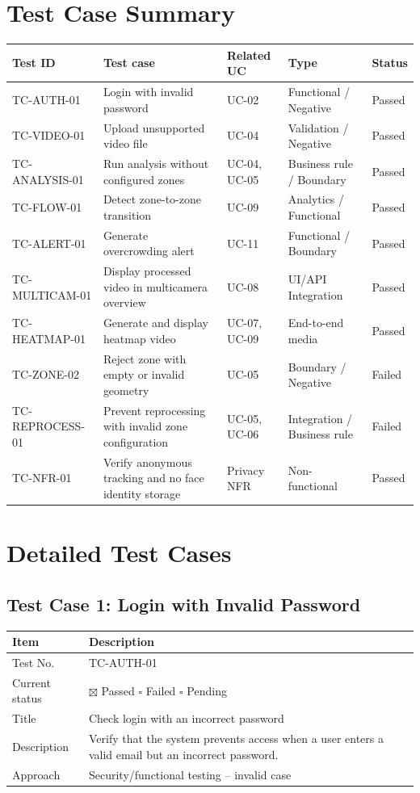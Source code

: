 \documentclass[12pt,a4paper]{report}
\begin{document}
\section{Test Case Summary}

\begin{longtable}{|p{2.5cm}|p{5.1cm}|p{2.3cm}|p{2.8cm}|p{1.9cm}|}
\hline
\rowcolor{HeaderBlue}
\textbf{Test ID} & \textbf{Test case} & \textbf{Related UC} & \textbf{Type} & \textbf{Status} \\
\hline
TC-AUTH-01 & Login with invalid password & UC-02 & Functional / Negative & Passed \\
\hline
TC-VIDEO-01 & Upload unsupported video file & UC-04 & Validation / Negative & Passed \\
\hline
TC-ANALYSIS-01 & Run analysis without configured zones & UC-04, UC-05 & Business rule / Boundary & Passed \\
\hline
TC-FLOW-01 & Detect zone-to-zone transition & UC-09 & Analytics / Functional & Passed \\
\hline
TC-ALERT-01 & Generate overcrowding alert & UC-11 & Functional / Boundary & Passed \\
\hline
TC-MULTICAM-01 & Display processed video in multicamera overview & UC-08 & UI/API Integration & Passed \\
\hline
TC-HEATMAP-01 & Generate and display heatmap video & UC-07, UC-09 & End-to-end media & Passed \\
\hline
TC-ZONE-02 & Reject zone with empty or invalid geometry & UC-05 & Boundary / Negative & Failed \\
\hline
TC-REPROCESS-01 & Prevent reprocessing with invalid zone configuration & UC-05, UC-06 & Integration / Business rule & Failed \\
\hline
TC-NFR-01 & Verify anonymous tracking and no face identity storage & Privacy NFR & Non-functional & Passed \\
\hline
\end{longtable}

\section{Detailed Test Cases}

\subsection{Test Case 1: Login with Invalid Password}
\begin{longtable}{|p{4cm}|p{10cm}|}
\hline
\rowcolor{HeaderBlue}\textbf{Item} & \textbf{Description} \\
\hline
Test No. & TC-AUTH-01 \\
\hline
Current status & $\boxtimes$ Passed \quad $\square$ Failed \quad $\square$ Pending \\
\hline
Title & Check login with an incorrect password \\
\hline
Description & Verify that the system prevents access when a user enters a valid email but an incorrect password. \\
\hline
Approach & Security/functional testing -- invalid case \\
\hline
\end{longtable}
\end{document}
